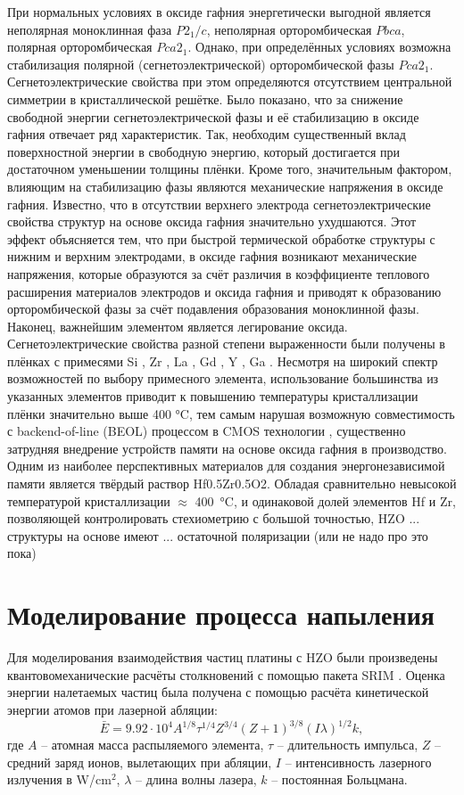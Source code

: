 При нормальных условиях в оксиде гафния энергетически выгодной является неполярная моноклинная фаза \(P2_1/c\), неполярная орторомбическая \(Pbca\), полярная орторомбическая \(Pca2_1\). Однако, при определённых условиях возможна стабилизация полярной (сегнетоэлектрической) орторомбической фазы \(Pca2_1\). Сегнетоэлектрические свойства при этом определяются отсутствием центральной симметрии в кристаллической решётке.
Было показано, что за снижение свободной энергии сегнетоэлектрической фазы и её стабилизацию в оксиде гафния отвечает ряд характеристик. Так, необходим существенный вклад поверхностной энергии в свободную энергию, который достигается при достаточном уменьшении толщины плёнки. Кроме того, значительным фактором, влияющим на стабилизацию фазы являются механические напряжения в оксиде гафния. Известно, что в отсутствии верхнего электрода сегнетоэлектрические свойства структур на основе оксида гафния значительно ухудшаются. Этот эффект объясняется тем, что при быстрой термической обработке структуры с нижним и верхним электродами, в оксиде гафния возникают механические напряжения, которые образуются за счёт различия в коэффициенте теплового расширения материалов электродов и оксида гафния и приводят к образованию орторомбической фазы за счёт подавления образования моноклинной фазы. Наконец, важнейшим элементом является легирование оксида. Сегнетоэлектрические свойства разной степени выраженности были получены в плёнках с примесями Si \cite{}, Zr \cite{}, La \cite{}, Gd \cite{}, Y \cite{}, Ga \cite{chouprikNanoscaleDopingIts2022}. Несмотря на широкий спектр возможностей по выбору примесного элемента, использование большинства из указанных элементов приводит к повышению температуры кристаллизации плёнки значительно выше 400 \si{\degreeCelsius}, тем самым нарушая возможную совместимость с backend-of-line (BEOL) процессом в CMOS технологии \cite{schmitzLowTemperatureThin2018}, существенно затрудняя внедрение устройств памяти на основе оксида гафния в производство. Одним из наиболее перспективных материалов для создания энергонезависимой памяти является твёрдый раствор Hf0.5Zr0.5O2. Обладая сравнительно невысокой температурой кристаллизации \(\approx\) \SI{400}{\degreeCelsius}, и одинаковой долей элементов Hf и Zr, позволяющей контролировать стехиометрию с большой точностью, HZO ... структуры на основе имеют ... остаточной поляризации (или не надо про это пока)
\section{Моделирование процесса напыления}\label{sec:ch2/sec2}
Для моделирования взаимодействия частиц платины с HZO были произведены квантовомеханические расчёты столкновений с помощью пакета SRIM . Оценка энергии налетаемых частиц была получена с помощью расчёта кинетической энергии атомов при лазерной абляции:
\[\bar{E} = 9.92 \cdot 10^{4} A^{1/8} \tau^{1/4} Z^{3/4} (Z+1)^{3/8} (I\lambda)^{1/2}k,\] где \(A\) -- атомная масса распыляемого элемента, \(\tau\) -- длительность импульса, \(Z\) -- средний заряд ионов, вылетающих при абляции, \(I\) -- интенсивность лазерного излучения в \si{\watt}/\si{\cm}\(^2\), \(\lambda\) -- длина волны лазера, \(k\) -- постоянная Больцмана.

